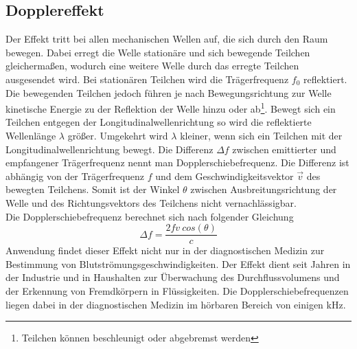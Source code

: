 \subsection{Dopplereffekt}\label{sec:dopplereffekt}
Der Effekt tritt bei allen mechanischen Wellen auf, die sich durch den Raum bewegen. Dabei erregt die Welle stationäre und sich bewegende Teilchen gleichermaßen, wodurch eine weitere Welle durch das erregte Teilchen ausgesendet wird. Bei stationären Teilchen wird die Trägerfrequenz $f_0$ reflektiert. Die bewegenden Teilchen jedoch führen je nach Bewegungsrichtung zur Welle kinetische Energie zu der Reflektion der Welle hinzu oder ab\footnote{Teilchen können beschleunigt oder abgebremst werden}. Bewegt sich ein Teilchen entgegen der Longitudinalwellenrichtung so wird die reflektierte Wellenlänge $\lambda$ größer. Umgekehrt wird $\lambda$ kleiner, wenn sich ein Teilchen mit der Longitudinalwellenrichtung bewegt.\newline
Die Differenz $\Delta f$ zwischen emittierter und empfangener Trägerfrequenz nennt man Dopplerschiebefrequenz. Die Differenz ist abhängig von der Trägerfrequenz $f$ und dem Geschwindigkeitsvektor $\overrightarrow{v}$ des bewegten Teilchens. Somit ist der Winkel $\theta$ zwischen Ausbreitungsrichtung der Welle und des Richtungsvektors des Teilchens nicht vernachlässigbar.\\
Die Dopplerschiebefrequenz berechnet sich nach folgender Gleichung
\begin{equation}
\Delta f=\dfrac{2fv\ cos(\theta)}{c}
\end{equation}
Anwendung findet dieser Effekt nicht nur in der diagnostischen Medizin zur Bestimmung von Blutströmungsgeschwindigkeiten. Der Effekt dient seit Jahren in der Industrie und in Haushalten zur Überwachung des Durchflussvolumens und der Erkennung von Fremdkörpern in Flüssigkeiten. Die Dopplerschiebefrequenzen liegen dabei in der diagnostischen Medizin im hörbaren Bereich von einigen kHz.

